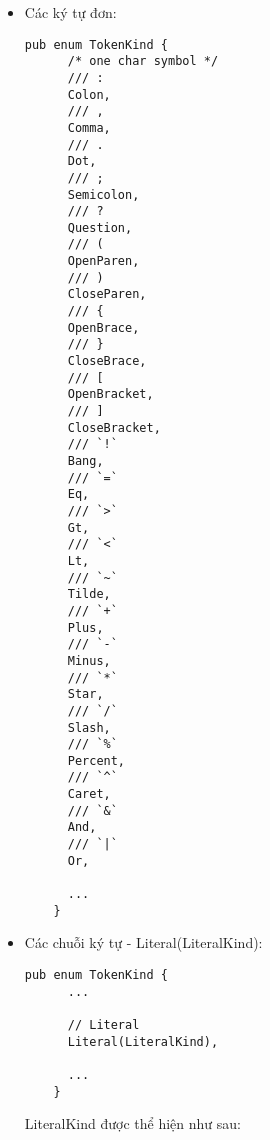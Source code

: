 \begin{itemize}
  \item Các ký tự đơn: 
  \begin{lstlisting}[]
    pub enum TokenKind {
      /* one char symbol */
      /// :
      Colon,
      /// ,
      Comma,
      /// .
      Dot,
      /// ;
      Semicolon,
      /// ?
      Question,
      /// (
      OpenParen,
      /// )
      CloseParen,
      /// {
      OpenBrace,
      /// }
      CloseBrace,
      /// [
      OpenBracket,
      /// ]
      CloseBracket,
      /// `!`
      Bang,
      /// `=`
      Eq,
      /// `>`
      Gt,
      /// `<`
      Lt,
      /// `~`
      Tilde,
      /// `+`
      Plus,
      /// `-`
      Minus,
      /// `*`
      Star,
      /// `/`
      Slash,
      /// `%`
      Percent,
      /// `^`
      Caret,
      /// `&`
      And,
      /// `|`
      Or,

      ...
    }
  \end{lstlisting}
  \item Các chuỗi ký tự - Literal(LiteralKind):
  \begin{lstlisting}[]
    pub enum TokenKind {
      ...
  
      // Literal
      Literal(LiteralKind),
  
      ...
    }
  \end{lstlisting}

    LiteralKind được thể hiện như sau:


\end{itemize}
